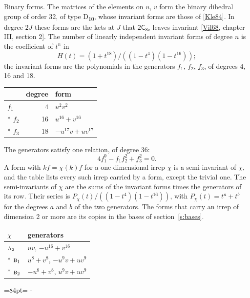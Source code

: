 \documentclass[10pt,a4paper]{article}
\makeatletter
\renewcommand\paragraph{\@startsection{paragraph}{4}{\z@}{1.5ex plus .5ex minus .2ex}{-1em}%
  {\normalfont\small\sffamily\bfseries\color{parttitle}}}
\newcommand{\needspace}[1]{\par\penalty-100\begingroup\dimen0=#1\relax\dimen2=\pagegoal
  \advance\dimen2-\pagetotal\ifdim\dimen0>\dimen2\relax\ifdim\dimen2>0pt\vfil\break\fi\fi
  \endgroup}
\numberwithin{equation}{section}
\newcommand{\grp}[1]{\mathsf{#1}}
\newcommand{\irr}[1]{\text{\normalfont\scshape #1}}
\makeatother
\begin{document}
\paragraph{Binary forms.}
The matrices of the elements on $u$, $v$ form the binary dihedral group of order 32, of type D\textsubscript{10}, whose invariant forms are those of [\href{../../../REFERENCES.pdf\#ref.Kle84}{Kle84}]. In degree $2J$ these forms are the kets at $J$ that $\grp{2C_{8v}}$ leaves invariant [\href{../../../REFERENCES.pdf\#ref.Vil68}{Vil68}, chapter III, section 2]. \label{n:head.degree}\label{n:head.form}The number of linearly independent invariant forms of degree $n$ is the coefficient of $t^n$ in
\begin{equation}\label{e:molien}H(t) = (1 + t^{18})/((1-t^{4})(1-t^{16}));\end{equation}
the invariant forms are the polynomials in the generators $f_1$, $f_2$, $f_3$, of degrees 4, 16 and 18.
{\small\begin{longtable}{@{}lrl@{}}\toprule
& degree & form\\\midrule\endhead
\bottomrule\endfoot\endlastfoot
$f_{1}$ & 4 & $u^{2}v^{2}$\\*
$f_{2}$ & 16 & $u^{16} + v^{16}$\\*
$f_{3}$ & 18 & $-u^{17}v + uv^{17}$\\
\bottomrule\end{longtable}}
The generators satisfy one relation, of degree 36:
\begin{equation}\label{e:relation}4f_{1}^{9} - f_{1}f_{2}^{2} + f_{3}^{2} = 0.\end{equation}
A form with $k f = \chi(k) f$ for a one-dimensional irrep $\chi$ is a semi-invariant of $\chi$, and the table lists every such irrep carried by a form, except the trivial one. \label{n:head.generators}The semi-invariants of $\chi$ are the sums of the invariant forms times the generators of its row. Their series is $P_\chi(t)/((1-t^{4})(1-t^{16}))$, with $P_\chi(t) = t^{a} + t^{b}$ for the degrees $a$ and $b$ of the two generators. The forms that carry an irrep of dimension 2 or more are its copies in the bases of section~\ref{s:bases}.
{\small\begin{longtable}{@{}ll@{}}\toprule
$\chi$ & generators\\\midrule\endhead
\bottomrule\endfoot\endlastfoot
$\irr{a}_{2}$ & $uv$, $-u^{16} + v^{16}$\\*
$\irr{b}_{1}$ & $u^{8} + v^{8}$, $-u^{9}v + uv^{9}$\\*
$\irr{b}_{2}$ & $-u^{8} + v^{8}$, $u^{9}v + uv^{9}$\\
\bottomrule\end{longtable}}
\needspace{84pt}
\end{document}
